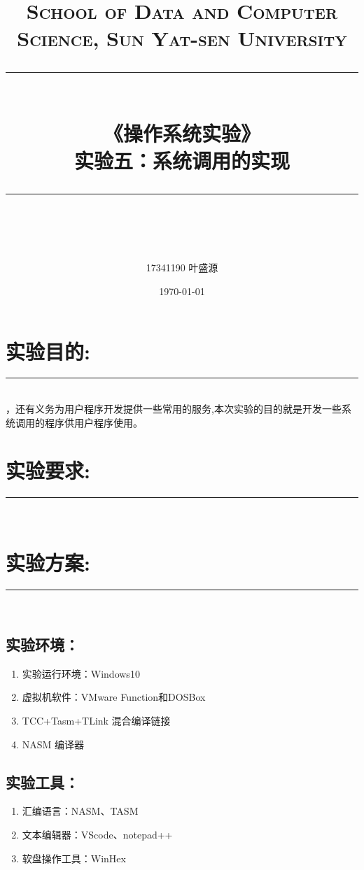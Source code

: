\documentclass[UTF8]{article}
\title{	
\normalfont \normalsize
\textsc{School of Data and Computer Science, Sun Yat-sen University} \\ [25pt] %
\rule{\textwidth}{0.5pt} \\[0.4cm] %
{\LARGE\heiti\bfseries  《操作系统实验》}\\[0.5cm] %
{\huge\bfseries\heiti 实验五：系统调用的实现 } \\
\rule{\textwidth}{2pt} \\[0.5cm] %
\author{\Large17341190 叶盛源}
\date{\normalsize\today}
}
\begin{document}
\maketitle
\tableofcontents
\newpage
\heiti 

\section{实验目的:}
\noindent\rule[0.2\baselineskip]{\textwidth}{0.5pt}\\[-23pt]
\vspace{0.25cm}
，还有义务为用户程序开发提供一些常用的服务,本次实验的目的就是开发一些系统调用的程序供用户程序使用。

\section{实验要求:}
\noindent\rule[0.2\baselineskip]{\textwidth}{0.5pt}\\[-23pt]
\vspace{0.25cm}


\section{实验方案:}
\noindent\rule[0.2\baselineskip]{\textwidth}{0.5pt}\\[-32pt]

\subsection{实验环境：}
\begin{enumerate}[1)]%
\heiti 
\setlength{\itemsep}{0em}
	\item 实验运行环境：Windows10
	\item 虚拟机软件：VMware Function和DOSBox
	\item TCC+Tasm+TLink 混合编译链接
	\item NASM 编译器
	\end{enumerate}
\subsection{实验工具：}
\begin{enumerate}[1)]%
\heiti\setlength{\itemsep}{0em}
	\item 汇编语言：NASM、TASM
	\item 文本编辑器：VScode、notepad++
	\item 软盘操作工具：WinHex
\end{enumerate}
\end{document}
